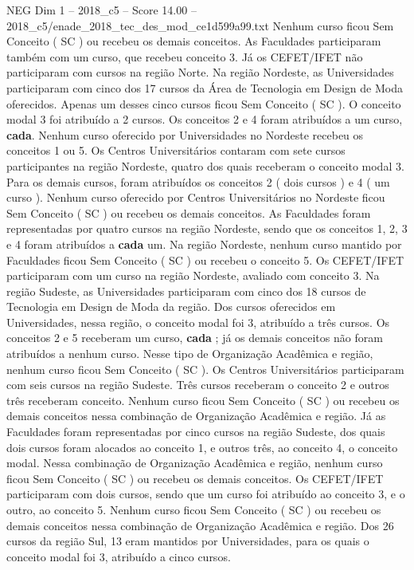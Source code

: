 \begin{textsample}{NEG Dim 1 – 2018\_c5 – Score 14.00 – 2018\_c5/enade\_2018\_tec\_des\_mod\_ce1d599a99.txt}
Nenhum curso ficou Sem Conceito ( SC ) ou recebeu os demais conceitos.
As Faculdades participaram também com um curso, que recebeu conceito 3.
Já os CEFET/IFET não participaram com cursos na região Norte.
Na região Nordeste, as Universidades participaram com cinco dos 17 cursos da Área de Tecnologia em Design de Moda oferecidos.
Apenas um desses cinco cursos ficou Sem Conceito ( SC ).
O conceito modal 3 foi atribuído a 2 cursos.
Os conceitos 2 e 4 foram atribuídos a um curso, \textbf{cada}.
Nenhum curso oferecido por Universidades no Nordeste recebeu os conceitos 1 ou 5.
Os Centros Universitários contaram com sete cursos participantes na região Nordeste, quatro dos quais receberam o conceito modal 3.
Para os demais cursos, foram atribuídos os conceitos 2 ( dois cursos ) e 4 ( um curso ).
Nenhum curso oferecido por Centros Universitários no Nordeste ficou Sem Conceito ( SC ) ou recebeu os demais conceitos.
As Faculdades foram representadas por quatro cursos na região Nordeste, sendo que os conceitos 1, 2, 3 e 4 foram atribuídos a \textbf{cada} um.
Na região Nordeste, nenhum curso mantido por Faculdades ficou Sem Conceito ( SC ) ou recebeu o conceito 5.
Os CEFET/IFET participaram com um curso na região Nordeste, avaliado com conceito 3.
Na região Sudeste, as Universidades participaram com cinco dos 18 cursos de Tecnologia em Design de Moda da região.
Dos cursos oferecidos em Universidades, nessa região, o conceito modal foi 3, atribuído a três cursos.
Os conceitos 2 e 5 receberam um curso, \textbf{cada} ; já os demais conceitos não foram atribuídos a nenhum curso.
Nesse tipo de Organização Acadêmica e região, nenhum curso ficou Sem Conceito ( SC ).
Os Centros Universitários participaram com seis cursos na região Sudeste.
Três cursos receberam o conceito 2 e outros três receberam conceito.
Nenhum curso ficou Sem Conceito ( SC ) ou recebeu os demais conceitos nessa combinação de Organização Acadêmica e região.
Já as Faculdades foram representadas por cinco cursos na região Sudeste, dos quais dois cursos foram alocados ao conceito 1, e outros três, ao conceito 4, o conceito modal.
Nessa combinação de Organização Acadêmica e região, nenhum curso ficou Sem Conceito ( SC ) ou recebeu os demais conceitos.
Os CEFET/IFET participaram com dois cursos, sendo que um curso foi atribuído ao conceito 3, e o outro, ao conceito 5.
Nenhum curso ficou Sem Conceito ( SC ) ou recebeu os demais conceitos nessa combinação de Organização Acadêmica e região.
Dos 26 cursos da região Sul, 13 eram mantidos por Universidades, para os quais o conceito modal foi 3, atribuído a cinco cursos.

\end{textsample}
